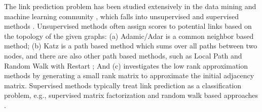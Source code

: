 









The link prediction problem has been studied extensively in the data mining and machine learning community
\cite{kleinberg,linyuan-2011}, which falls into unsupervised and supervised methods \cite{propflow}. Unsupervised methods
often assign scores to potential links based on the topology of the given graphs:
(a) Adamic/Adar \cite{adamic} is a common neighbor based method; (b) Katz \cite{katz-1953} is a
path based method which sums over all paths between two nodes, and there are also other path based
methods, such as Local Path and Random Walk with Restart \cite{linyuan-2011}; And (c)
 investigates the low rank approximation methods by generating a
small rank matrix to approximate the initial adjacency matrix. Supervised methods
typically treat link prediction as a classification problem, e.g., supervised matrix factorization and random walk based approaches \cite{menon,back}.

